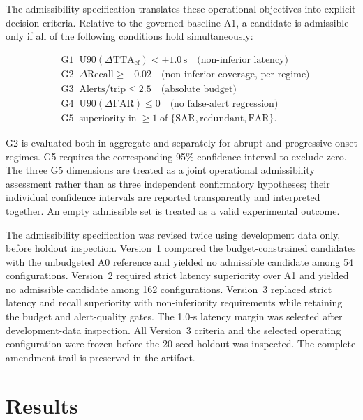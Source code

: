 \documentclass[conference]{IEEEtran}
\newcommand{\ttaef}{\mathrm{TTA}_{\mathrm{ef}}}
\begin{document}
The admissibility specification translates these operational objectives
into explicit decision criteria. Relative to the governed baseline A1, a candidate is admissible only if
all of the following conditions hold simultaneously:

\begin{align*}
&\mathrm{G1}\;\; \mathrm{U90}(\Delta\ttaef) < +1.0\,\mathrm{s}
 \quad\text{(non-inferior latency)}\\
&\mathrm{G2}\;\; \Delta\mathrm{Recall} \geq -0.02
 \quad\text{(non-inferior coverage, per regime)}\\
&\mathrm{G3}\;\; \mathrm{Alerts/trip} \leq 2.5
 \quad\text{(absolute budget)}\\
&\mathrm{G4}\;\; \mathrm{U90}(\Delta\mathrm{FAR}) \leq 0
 \quad\text{(no false-alert regression)}\\
&\mathrm{G5}\;\; \text{superiority in}\;{\geq}1\;\text{of}\;
 \{\mathrm{SAR},\mathrm{redundant},\mathrm{FAR}\}.
\end{align*}

G2 is evaluated both in aggregate and separately for abrupt and
progressive onset regimes. G5 requires the corresponding 95\% confidence
interval to exclude zero. The three G5 dimensions are treated as a
joint operational admissibility assessment rather than as three
independent confirmatory hypotheses; their individual confidence
intervals are reported transparently and interpreted together. An empty
admissible set is treated as a valid experimental outcome.

The admissibility specification was revised twice using development
data only, before holdout inspection. Version~1 compared the
budget-constrained candidates with the unbudgeted A0 reference and
yielded no admissible candidate among 54 configurations. Version~2
required strict latency superiority over A1 and yielded no admissible
candidate among 162 configurations. Version~3 replaced strict latency
and recall superiority with non-inferiority requirements while
retaining the budget and alert-quality gates. The 1.0-s latency margin
was selected after development-data inspection. All Version~3 criteria
and the selected operating configuration were frozen before the
20-seed holdout was inspected. The complete amendment trail is
preserved in the artifact.

\section{Results}
\label{sec:results}
\end{document}
